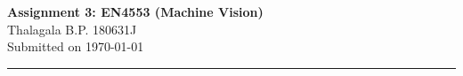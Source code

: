 \documentclass[a4paper,11pt]{article}%
\begin{document}
    
	\begin{center}
	{\large \textbf{Assignment 3: EN4553 (Machine Vision)}}\\
	Thalagala B.P.\hspace{0.5cm} 180631J\\
	Submitted on \today
	
\end{center}
\hrule

%
\end{document}
